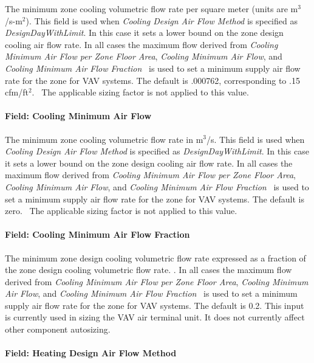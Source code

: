 The minimum zone cooling volumetric flow rate per square meter (units are m\(^{3}\)/s-m\(^{2}\)). This field is used when \emph{Cooling Design Air Flow Method} is specified as \emph{DesignDayWithLimit}. In this case it sets a lower bound on the zone design cooling air flow rate. In all cases the maximum flow derived from \emph{Cooling Minimum Air Flow per Zone Floor Area}, \emph{Cooling Minimum Air Flow}, and \emph{Cooling Minimum Air Flow Fraction}~ is used to set a minimum supply air flow rate for the zone for VAV systems. The default is .000762, corresponding to .15 cfm/ft\(^{2}\).~ The applicable sizing factor is not applied to this value.

\paragraph{Field: Cooling Minimum Air Flow}\label{field-cooling-minimum-air-flow}

The minimum zone cooling volumetric flow rate in m\(^{3}\)/s. This field is used when \emph{Cooling Design Air Flow Method} is specified as \emph{DesignDayWithLimit}. In this case it sets a lower bound on the zone design cooling air flow rate. In all cases the maximum flow derived from \emph{Cooling Minimum Air Flow per Zone Floor Area}, \emph{Cooling Minimum Air Flow}, and \emph{Cooling Minimum Air Flow Fraction}~ is used to set a minimum supply air flow rate for the zone for VAV systems. The default is zero.~ The applicable sizing factor is not applied to this value.

\paragraph{Field: Cooling Minimum Air Flow Fraction}\label{field-cooling-minimum-air-flow-fraction}

The minimum zone design cooling volumetric flow rate expressed as a fraction of the zone design cooling volumetric flow rate. . In all cases the maximum flow derived from \emph{Cooling Minimum Air Flow per Zone Floor Area}, \emph{Cooling Minimum Air Flow}, and \emph{Cooling Minimum Air Flow Fraction}~ is used to set a minimum supply air flow rate for the zone for VAV systems. The default is 0.2. This input is currently used in sizing the VAV air terminal unit. It does not currently affect other component autosizing.

\paragraph{Field: Heating Design Air Flow Method}\label{field-heating-design-air-flow-method}

